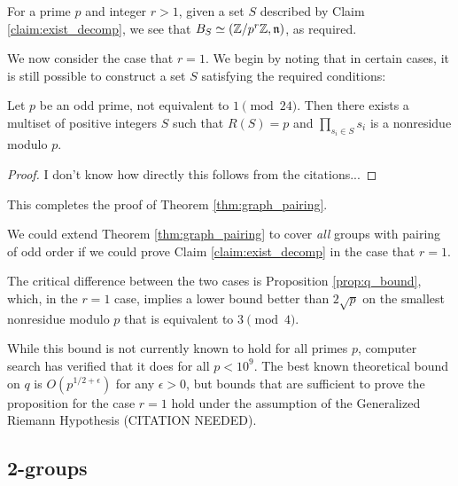 \documentclass{amsart}
\begin{document}
For a prime $p$ and integer $r > 1$, given a set $S$ described by
Claim \ref{claim:exist_decomp}, we see that $B_S \simeq (\mathbb{Z}/p^r\mathbb{Z},
\mathfrak{n})$, as required.

We now consider the case that $r=1$. We begin by noting that in
certain cases, it is still possible to construct a set $S$
satisfying the required conditions:
\begin{prop}
  Let $p$ be an odd prime, not equivalent to $1 \pmod {24}$. Then
  there exists a multiset of positive integers $S$ such that $R(S) =
  p$ and $\prod_{s_i \in S}s_i$ is a nonresidue modulo $p$.
\end{prop}
\begin{proof}
  I don't know how directly this follows from the citations...
\end{proof}

This completes the proof of Theorem \ref{thm:graph_pairing}.

\begin{remark} We could extend Theorem \ref{thm:graph_pairing} to
  cover \emph{all} groups with pairing of odd order if we could prove
  Claim \ref{claim:exist_decomp} in the case that $r=1$.
  
  The critical difference between the two cases is Proposition
  \ref{prop:q_bound}, which, in the $r=1$ case, implies a lower bound
  better than $2\sqrt{p}$ on the smallest nonresidue modulo $p$ that
  is equivalent to $3 \pmod 4$.

  While this bound is not currently known to hold for all primes $p$,
  computer search has verified that it does for all $p < 10^9$. The
  best known theoretical bound on $q$ is $O(p^{1/2 + \epsilon})$ for
  any $\epsilon > 0$, but bounds that are sufficient to prove the
  proposition for the case $r=1$ hold under the assumption of the
  Generalized Riemann Hypothesis (CITATION NEEDED).
\end{remark}

\subsection{2-groups}
\end{document}

